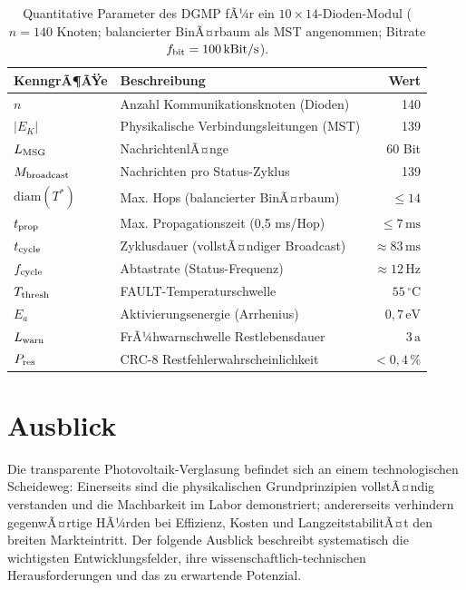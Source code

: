 ﻿\documentclass[a4paper,12pt]{article}
\theoremstyle{definition}
\theoremstyle{remark}
\begin{document}
\begin{table}[H]
  \centering
  \renewcommand{\arraystretch}{1.3}
  \caption{Quantitative Parameter des DGMP fÃ¼r ein $10 \times 14$-Dioden-Modul
    ($n = 140$ Knoten; balancierter BinÃ¤rbaum als MST angenommen;
    Bitrate $f_{\rm bit} = 100\,\mathrm{kBit/s}$).}
  \label{tab:dgmp_zusammenfassung}
  \begin{tabularx}{\textwidth}{lXr}
    \toprule
    \textbf{KenngrÃ¶ÃŸe} & \textbf{Beschreibung} & \textbf{Wert} \\
    \midrule
    $n$                 & Anzahl Kommunikationsknoten (Dioden) & 140 \\
    $|E_K|$             & Physikalische Verbindungsleitungen (MST) & 139 \\
    $L_{\rm MSG}$       & NachrichtenlÃ¤nge                          & 60 Bit \\
    $M_{\rm broadcast}$ & Nachrichten pro Status-Zyklus             & 139 \\
    $\mathrm{diam}(T^*)$& Max. Hops (balancierter BinÃ¤rbaum)        & $\leq 14$ \\
    $t_{\rm prop}$      & Max. Propagationszeit (0{,}5 ms/Hop)      & $\leq 7\,\mathrm{ms}$ \\
    $t_{\rm cycle}$     & Zyklusdauer (vollstÃ¤ndiger Broadcast)     & $\approx 83\,\mathrm{ms}$ \\
    $f_{\rm cycle}$     & Abtastrate (Status-Frequenz)              & $\approx 12\,\mathrm{Hz}$ \\
    $T_{\rm thresh}$    & FAULT-Temperaturschwelle                  & $55\,^{\circ}$C \\
    $E_a$               & Aktivierungsenergie (Arrhenius)           & $0{,}7\,\mathrm{eV}$ \\
    $L_{\rm warn}$      & FrÃ¼hwarnschwelle Restlebensdauer          & $3\,\mathrm{a}$ \\
    $P_{\rm res}$       & CRC-8 Restfehlerwahrscheinlichkeit        & $< 0{,}4\,\%$ \\
    \bottomrule
  \end{tabularx}
\end{table}


\section{Ausblick}
\label{sec:ausblick}

Die transparente Photovoltaik-Verglasung befindet sich an einem
technologischen Scheideweg: Einerseits sind die physikalischen Grundprinzipien
vollstÃ¤ndig verstanden und die Machbarkeit im Labor demonstriert; andererseits
verhindern gegenwÃ¤rtige HÃ¼rden bei Effizienz, Kosten und
LangzeitstabilitÃ¤t den breiten Markteintritt. Der folgende Ausblick beschreibt
systematisch die wichtigsten Entwicklungsfelder, ihre wissenschaftlich-technischen
Herausforderungen und das zu erwartende Potenzial.
\end{document}
